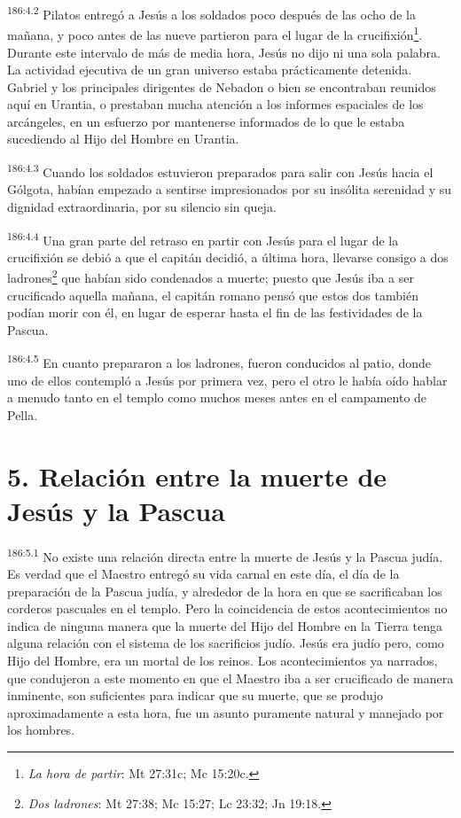 \par
\textsuperscript{186:4.2} Pilatos entregó a Jesús a los soldados poco después de las ocho de la mañana, y poco antes de las nueve partieron para el lugar de la crucifixión\footnote{\textit{La hora de partir}: Mt 27:31c; Mc 15:20c.}. Durante este intervalo de más de media hora, Jesús no dijo ni una sola palabra. La actividad ejecutiva de un gran universo estaba prácticamente detenida. Gabriel y los principales dirigentes de Nebadon o bien se encontraban reunidos aquí en Urantia, o prestaban mucha atención a los informes espaciales de los arcángeles, en un esfuerzo por mantenerse informados de lo que le estaba sucediendo al Hijo del Hombre en Urantia.

\par
\textsuperscript{186:4.3} Cuando los soldados estuvieron preparados para salir con Jesús hacia el Gólgota, habían empezado a sentirse impresionados por su insólita serenidad y su dignidad extraordinaria, por su silencio sin queja.

\par
\textsuperscript{186:4.4} Una gran parte del retraso en partir con Jesús para el lugar de la crucifixión se debió a que el capitán decidió, a última hora, llevarse consigo a dos ladrones\footnote{\textit{Dos ladrones}: Mt 27:38; Mc 15:27; Lc 23:32; Jn 19:18.} que habían sido condenados a muerte; puesto que Jesús iba a ser crucificado aquella mañana, el capitán romano pensó que estos dos también podían morir con él, en lugar de esperar hasta el fin de las festividades de la Pascua.

\par
\textsuperscript{186:4.5} En cuanto prepararon a los ladrones, fueron conducidos al patio, donde uno de ellos contempló a Jesús por primera vez, pero el otro le había oído hablar a menudo tanto en el templo como muchos meses antes en el campamento de Pella.

\section*{5. Relación entre la muerte de Jesús y la Pascua}
\par
\textsuperscript{186:5.1} No existe una relación directa entre la muerte de Jesús y la Pascua judía. Es verdad que el Maestro entregó su vida carnal en este día, el día de la preparación de la Pascua judía, y alrededor de la hora en que se sacrificaban los corderos pascuales en el templo. Pero la coincidencia de estos acontecimientos no indica de ninguna manera que la muerte del Hijo del Hombre en la Tierra tenga alguna relación con el sistema de los sacrificios judío. Jesús era judío pero, como Hijo del Hombre, era un mortal de los reinos. Los acontecimientos ya narrados, que condujeron a este momento en que el Maestro iba a ser crucificado de manera inminente, son suficientes para indicar que su muerte, que se produjo aproximadamente a esta hora, fue un asunto puramente natural y manejado por los hombres.

